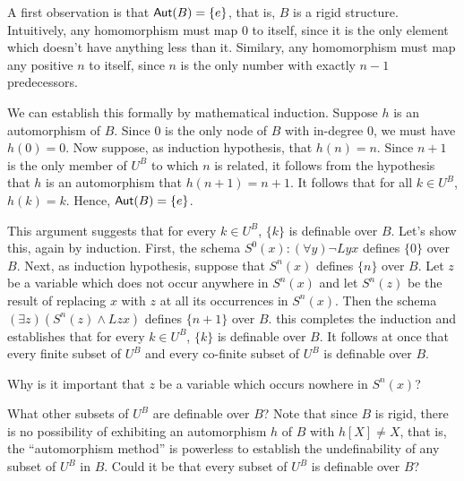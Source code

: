 A first observation is that $\mbox{$\mathsf{Aut}(B)$}=\{e\}$, that is, $B$ is a rigid structure. Intuitively, any homomorphism must map $0$ to itself, since it is the only element which doesn't have anything less than it. Similary, any homomorphism must map any positive $n$ to itself, since $n$ is the only number with exactly $n - 1$ predecessors. 

We can establish this formally by mathematical induction. Suppose $h$ is an automorphism of $B$. Since $0$ is the only node of $B$ with in-degree $0$, we must have $h(0)=0$. Now suppose, as induction hypothesis, that $h(n)=n$. Since $n+1$ is the only member of $U^B$ to which $n$ is related, it follows from the hypothesis that $h$ is an automorphism that $h(n+1)=n+1$. It follows that for all $k\in U^B$, $h(k)=k$. Hence, $\mbox{$\mathsf{Aut}(B)$}=\{e\}$. 

This argument suggests that for every $k\in U^B$, $\{k\}$ is definable over $B$. Let's show this, again by induction. First, the schema $S^0(x): (\forall y)\neg Lyx$ defines $\{0\}$ over $B$. Next, as induction hypothesis, suppose that $S^n(x)$ defines $\{n\}$ over $B$. Let $z$ be a variable which does not occur anywhere in $S^n(x)$ and let $S^n(z)$ be the result of replacing $x$ with $z$ at all its occurrences in $S^n(x)$. Then the schema $(\exists z)(S^n(z)\wedge Lzx)$ defines $\{n+1\}$ over $B$. this completes the induction and establishes that for every $k\in U^B$, $\{k\}$ is definable over $B$. It follows at once that every finite subset of $U^B$ and every co-finite subset of $U^B$ is definable over $B$. 

\begin{aside}
    Why is it important that $z$ be a variable which occurs nowhere in $S^n(x)$?
\end{aside}

What other subsets of $U^B$ are definable over $B$? Note that since $B$ is rigid, there is no possibility of exhibiting an automorphism $h$ of $B$ with $h[X]\neq X$, that is, the ``automorphism method'' is powerless to establish the undefinability of any subset of $U^B$ in $B$. Could it be that every subset of $U^B$ is definable over $B$? 



